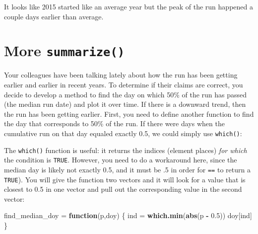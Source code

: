 \documentclass[]{book}
\newenvironment{Shaded}{\begin{snugshade}}{\end{snugshade}}
\newcommand{\ControlFlowTok}[1]{\textcolor[rgb]{0.13,0.29,0.53}{\textbf{#1}}}
\newcommand{\FloatTok}[1]{\textcolor[rgb]{0.00,0.00,0.81}{#1}}
\newcommand{\KeywordTok}[1]{\textcolor[rgb]{0.13,0.29,0.53}{\textbf{#1}}}
\newcommand{\NormalTok}[1]{#1}
\newcommand{\OperatorTok}[1]{\textcolor[rgb]{0.81,0.36,0.00}{\textbf{#1}}}
\newcommand{\StringTok}[1]{\textcolor[rgb]{0.31,0.60,0.02}{#1}}
\begin{document}
It looks like 2015 started like an average year but the peak of the run happened a couple days earlier than average.

\hypertarget{more-summarize}{%
\section{\texorpdfstring{More \texttt{summarize()}}{More summarize()}}\label{more-summarize}}

Your colleagues have been talking lately about how the run has been getting earlier and earlier in recent years. To determine if their claims are correct, you decide to develop a method to find the day on which 50\% of the run has passed (the median run date) and plot it over time. If there is a downward trend, then the run has been getting earlier. First, you need to define another function to find the day that corresponds to 50\% of the run. If there were days when the cumulative run on that day equaled exactly 0.5, we could simply use \texttt{which()}:

\begin{Shaded}
\end{Shaded}

The \texttt{which()} function is useful: it returns the indices (element places) \emph{for which} the condition is \texttt{TRUE}. However, you need to do a workaround here, since the median day is likely not exactly 0.5, and it must be .5 in order for \texttt{==} to return a \texttt{TRUE}). You will give the function two vectors and it will look for a value that is closest to 0.5 in one vector and pull out the corresponding value in the second vector:

\begin{Shaded}
\begin{Highlighting}[]
\NormalTok{find_median_doy =}\StringTok{ }\ControlFlowTok{function}\NormalTok{(p,doy) \{}
\NormalTok{  ind =}\StringTok{ }\KeywordTok{which.min}\NormalTok{(}\KeywordTok{abs}\NormalTok{(p }\OperatorTok{-}\StringTok{ }\FloatTok{0.5}\NormalTok{))}
\NormalTok{  doy[ind]}
\NormalTok{\}}
\end{Highlighting}
\end{Shaded}
\end{document}

